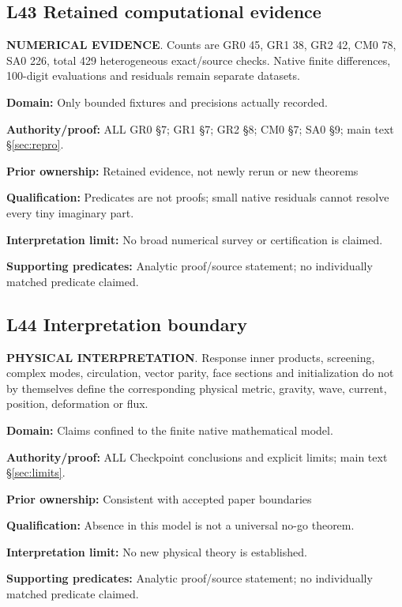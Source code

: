 \par\noindent\begin{minipage}{\linewidth}
\subsection*{L43 Retained computational evidence}
\textbf{NUMERICAL EVIDENCE}. Counts are GR0 45, GR1 38, GR2 42, CM0 78, SA0 226, total 429 heterogeneous exact/source checks. Native finite differences, 100-digit evaluations and residuals remain separate datasets.\par
\textbf{Domain:} Only bounded fixtures and precisions actually recorded.\par
\textbf{Authority/proof:} ALL GR0 \S{}7; GR1 \S{}7; GR2 \S{}8; CM0 \S{}7; SA0 \S{}9; main text \S\ref{sec:repro}.\par
\textbf{Prior ownership:} Retained evidence, not newly rerun or new theorems\par
\textbf{Qualification:} Predicates are not proofs; small native residuals cannot resolve every tiny imaginary part.\par
\textbf{Interpretation limit:} No broad numerical survey or certification is claimed.\par
\textbf{Supporting predicates:} Analytic proof/source statement; no individually matched predicate claimed.\par
\end{minipage}\par\medskip
\par\noindent\begin{minipage}{\linewidth}
\subsection*{L44 Interpretation boundary}
\textbf{PHYSICAL INTERPRETATION}. Response inner products, screening, complex modes, circulation, vector parity, face sections and initialization do not by themselves define the corresponding physical metric, gravity, wave, current, position, deformation or flux.\par
\textbf{Domain:} Claims confined to the finite native mathematical model.\par
\textbf{Authority/proof:} ALL Checkpoint conclusions and explicit limits; main text \S\ref{sec:limits}.\par
\textbf{Prior ownership:} Consistent with accepted paper boundaries\par
\textbf{Qualification:} Absence in this model is not a universal no-go theorem.\par
\textbf{Interpretation limit:} No new physical theory is established.\par
\textbf{Supporting predicates:} Analytic proof/source statement; no individually matched predicate claimed.\par
\end{minipage}\par\medskip
